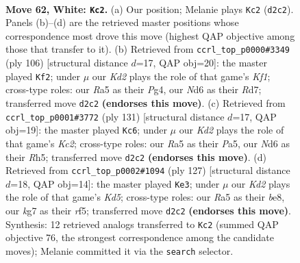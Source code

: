 \documentclass[11pt]{article}
\begin{document}
\clearpage

\begin{figure}[p]\centering
\begin{subfigure}{0.46\textwidth}\centering
\resizebox{\linewidth}{!}{%
\newchessgame
\chessboard[
  setfen={8/6k1/3Nn1P1/R7/P7/7r/3K4/6b1 w - - 5 62},
  showmover=false,
  pgfstyle=straightmove, color=movearrow, markmove={d2-c2}
]}
\caption{}
\end{subfigure}\hfill
\begin{subfigure}{0.46\textwidth}\centering
\resizebox{\linewidth}{!}{%
\newchessgame
\chessboard[
  setfen={2r4k/3R3P/8/6p1/6P1/8/8/5K2 w - - 4 54},
  showmover=false,
  pgfstyle=straightmove, color=movearrow, markmove={f1-f2}
]}
\caption{}
\end{subfigure}
\\[4pt]
\begin{subfigure}{0.46\textwidth}\centering
\resizebox{\linewidth}{!}{%
\newchessgame
\chessboard[
  setfen={8/2k5/8/p1p4r/P1K5/8/6R1/8 b - - 5 66},
  showmover=false,
  pgfstyle=straightmove, color=movearrow, markmove={c7-c6}
]}
\caption{}
\end{subfigure}\hfill
\begin{subfigure}{0.46\textwidth}\centering
\resizebox{\linewidth}{!}{%
\newchessgame
\chessboard[
  setfen={4B3/8/8/p4R2/3k1p1p/8/7K/r7 b - - 3 64},
  showmover=false,
  pgfstyle=straightmove, color=movearrow, markmove={d4-e3}
]}
\caption{}
\end{subfigure}
\caption{\textbf{Move 62, White: \texttt{Kc2}.} (a) Our position; Melanie plays \texttt{Kc2} (\texttt{d2c2}). Panels (b)--(d) are the retrieved master positions whose correspondence most drove this move (highest QAP objective among those that transfer to it). (b) Retrieved from \texttt{ccrl\_top\_p0000\#3349} (ply 106) [structural distance $d$=17, QAP obj=20]: the master played \texttt{Kf2}; under $\mu$ our \emph{Kd2} plays the role of that game's \emph{Kf1}; cross-type roles: our \emph{R}a5 as their \emph{P}g4, our \emph{N}d6 as their \emph{R}d7; transferred move \texttt{d2c2} \textbf{(endorses this move)}. (c) Retrieved from \texttt{ccrl\_top\_p0001\#3772} (ply 131) [structural distance $d$=17, QAP obj=19]: the master played \texttt{Kc6}; under $\mu$ our \emph{Kd2} plays the role of that game's \emph{Kc2}; cross-type roles: our \emph{R}a5 as their \emph{P}a5, our \emph{N}d6 as their \emph{R}h5; transferred move \texttt{d2c2} \textbf{(endorses this move)}. (d) Retrieved from \texttt{ccrl\_top\_p0002\#1094} (ply 127) [structural distance $d$=18, QAP obj=14]: the master played \texttt{Ke3}; under $\mu$ our \emph{Kd2} plays the role of that game's \emph{Kd5}; cross-type roles: our \emph{R}a5 as their \emph{b}e8, our \emph{k}g7 as their \emph{r}f5; transferred move \texttt{d2c2} \textbf{(endorses this move)}. Synthesis: 12 retrieved analogs transferred to \texttt{Kc2} (summed QAP objective 76, the strongest correspondence among the candidate moves); Melanie committed it via the \texttt{search} selector.}
\label{fig:thought-m122}
\end{figure}
\end{document}
